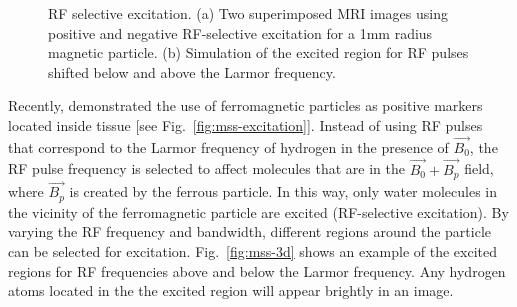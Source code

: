 \documentclass[journal]{IEEEtran}
\begin{document}
\begin{figure}
\begin{center}
\end{center}
\caption{RF selective excitation. (a) Two superimposed MRI images using positive and negative RF-selective excitation for a 1mm radius magnetic particle. (b) Simulation of the excited region for RF pulses shifted below and above the Larmor frequency.}
\end{figure}

Recently, \cite{chanu2008adapting, cunningham2005positive} demonstrated the use of ferromagnetic particles as positive markers located inside tissue [see Fig.\ \ref{fig:mss-excitation}]. Instead of using RF pulses that correspond to the Larmor frequency of hydrogen in the presence of $\vec{B_0}$, the RF pulse frequency is selected to affect molecules that are in the $\vec{B_0} + \vec{B_p}$ field, where $\vec{B_p}$ is created by the ferrous particle. In this way, only water molecules in the vicinity of the ferromagnetic particle are excited (RF-selective excitation). By varying the RF frequency and bandwidth, different regions around the particle can be selected for excitation. Fig.\ \ref{fig:mss-3d} shows an example of the excited regions for RF frequencies above and below the Larmor frequency. Any hydrogen atoms located in the the excited region will appear brightly in an image. 
\end{document}
